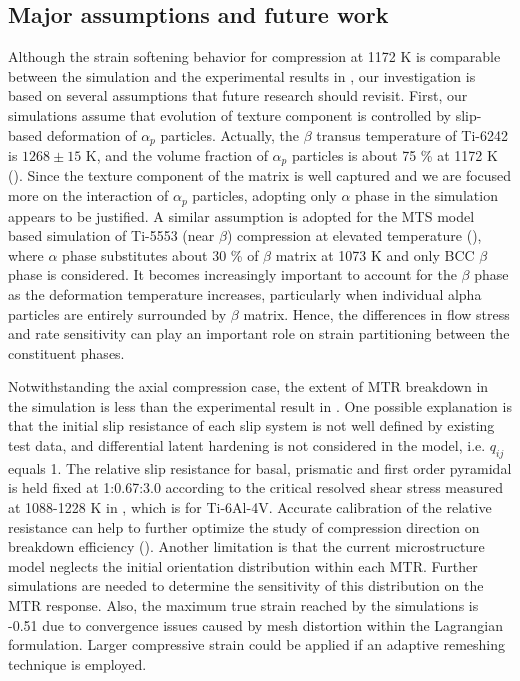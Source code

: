 \documentclass[review]{elsarticle}
\begin{document}
\subsection{Major assumptions and future work}
Although the strain softening behavior for compression at 1172 K is comparable between the simulation and the experimental results in \cite{r26}, our investigation is based on several assumptions that future research should revisit.
First, our simulations assume that evolution of texture component is controlled by slip-based deformation of $\alpha_p$ particles.
Actually, the $\beta$ transus temperature of Ti-6242 is $1268\pm15$ K, and the volume fraction of $\alpha_p$ particles is about 75 \% at 1172 K (\cite{r26}).
Since the texture component of the matrix is well captured and we are focused more on the interaction of $\alpha_p$ particles, adopting only $\alpha$ phase in the simulation appears to be justified.
A similar assumption is adopted for the MTS model based simulation of Ti-5553 (near $\beta$) compression at elevated temperature (\cite{r17}), where $\alpha$ phase substitutes about 30 \% of $\beta$ matrix at 1073 K and only BCC $\beta$ phase is considered.
It becomes increasingly important to account for the $\beta$ phase as the deformation temperature increases, particularly when individual alpha particles are entirely surrounded by $\beta$ matrix.
Hence, the differences in flow stress and rate sensitivity can play an important role on strain partitioning between the constituent phases.

Notwithstanding the axial compression case, the extent of MTR breakdown in the simulation is less than the experimental result in \cite{r14}.
One possible explanation is that the initial slip resistance of each slip system is not well defined by existing test data, and differential latent hardening is not considered in the model, i.e. $q_{ij}$ equals 1.
The relative slip resistance for basal, prismatic and first order pyramidal is held fixed at 1:0.67:3.0 according to the critical resolved shear stress measured at 1088-1228 K in \cite{r27}, which is for Ti-6Al-4V.
Accurate calibration of the relative resistance can help to further optimize the study of compression direction on breakdown efficiency (\cite{r13}).
Another limitation is that the current microstructure model neglects the initial orientation distribution within each MTR.
Further simulations are needed to determine the sensitivity of this distribution on the MTR response.
Also, the maximum true strain reached by the simulations is -0.51 due to convergence issues caused by mesh distortion within the Lagrangian formulation.
Larger compressive strain could be applied if an adaptive remeshing technique is employed. 
\end{document}
